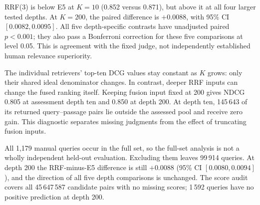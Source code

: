 RRF(3) is below E5 at $K=10$ (0.852 versus 0.871), but above it at all four larger tested depths. At $K=200$, the paired difference is $+0.0088$, with 95\% CI $[0.0082, 0.0095]$. All five depth-specific contrasts have unadjusted paired $p<0.001$; they also pass a Bonferroni correction for these five comparisons at level 0.05. This is agreement with the fixed judge, not independently established human relevance superiority.

The individual retrievers' top-ten DCG values stay constant as $K$ grows: only their shared ideal denominator changes. In contrast, deeper RRF inputs can change the fused ranking itself. Keeping fusion input fixed at 200 gives NDCG 0.805 at assessment depth ten and 0.850 at depth 200. At depth ten, 145\,643 of its returned query--passage pairs lie outside the assessed pool and receive zero gain. This diagnostic separates missing judgments from the effect of truncating fusion inputs.

All 1,179 manual queries occur in the full set, so the full-set analysis is not a wholly independent held-out evaluation. Excluding them leaves 99\,914 queries. At depth 200 the RRF-minus-E5 difference is still $+0.0088$ (95\% CI $[0.0080, 0.0094]$), and the direction of all five depth comparisons is unchanged. The score audit covers all 45\,647\,587 candidate pairs with no missing scores; 1\,592 queries have no positive prediction at depth 200.
